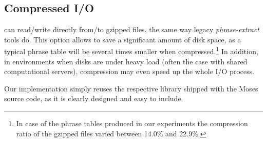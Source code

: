 \subsection{Compressed I/O}

\Eppex{} can read/write directly from/to gzipped files, the same way legacy \emph{phrase-extract}
tools do.
This option allows to save a significant amount of disk space, as a typical phrase table will be
several times smaller when compressed.\footnote{In case of the phrase tables produced in our experiments
the compression ratio of the gzipped files varied between 14.0\% and 22.9\%.}
In addition, in environments when disks are under heavy load (often the case with shared computational servers),
compression may even speed up the whole I/O process.

Our implementation simply reuses the respective library shipped with the Moses source code,
as it is clearly designed and easy to include.
